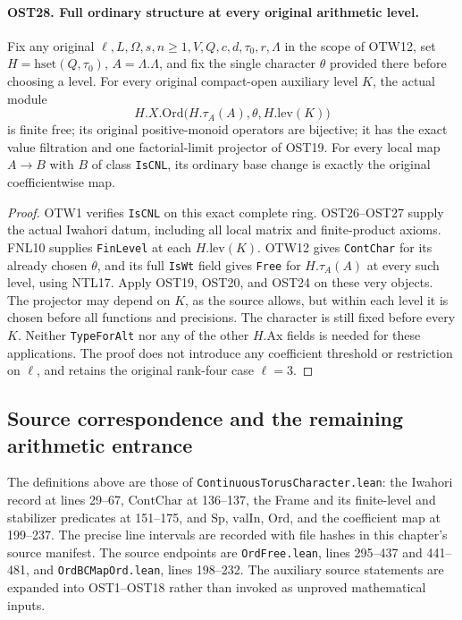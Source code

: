 \paragraph{OST28. Full ordinary structure at every original arithmetic level.}
\label{claim:OST28}
Fix any original $\ell,L,\Omega,s,n\geq1,V,Q,c,d,\tau_0,r,\Lambda$
in the scope of OTW12, set $H=\mathrm{hset}(Q,\tau_0)$,
$A=\Lambda.\Lambda$, and fix the single character $\theta$
provided there before choosing a level.  For every original
compact-open auxiliary level $K$, the actual module
\[
 H.X.\mathrm{Ord}\bigl(H.\tau_A(A),\theta,H.\mathrm{lev}(K)\bigr)
\]
is finite free; its original positive-monoid operators are
bijective; it has the exact value filtration and one
factorial-limit projector of OST19.  For every local map
$A\to B$ with $B$ of class \texttt{IsCNL}, its ordinary
base change is exactly the original coefficientwise map.
\begin{proof}
OTW1 verifies \texttt{IsCNL} on this exact complete ring.
OST26--OST27 supply the actual Iwahori datum, including all
local matrix and finite-product axioms.  FNL10 supplies
\texttt{FinLevel} at each $H.\mathrm{lev}(K)$.  OTW12 gives
\texttt{ContChar} for its already chosen $\theta$, and its
full \texttt{IsWt} field gives \texttt{Free} for
$H.\tau_A(A)$ at every such level, using NTL17.
Apply OST19, OST20, and OST24 on these very objects.
The projector may depend on $K$, as the source allows, but
within each level it is chosen before all functions and
precisions.  The character is still fixed before every $K$.
Neither \texttt{TypeForAlt} nor any of the other
$H.\mathrm{Ax}$ fields is needed for these applications.
The proof does not introduce any coefficient threshold or
restriction on $\ell$, and retains the original rank-four
case $\ell=3$.
\end{proof}

\subsection{Source correspondence and the remaining arithmetic entrance}

The definitions above are those of
\texttt{ContinuousTorusCharacter.lean}: the Iwahori record at
lines 29--67, $\mathrm{ContChar}$ at 136--137, the Frame and
its finite-level and stabilizer predicates at 151--175, and
$\mathrm{Sp}$, $\mathrm{valIn}$, $\mathrm{Ord}$, and the
coefficient map at 199--237.  The precise line intervals are
recorded with file hashes in this chapter's source manifest.
The source endpoints are
\texttt{OrdFree.lean}, lines 295--437 and 441--481, and
\texttt{OrdBCMapOrd.lean}, lines 198--232.  The auxiliary
source statements are expanded into OST1--OST18 rather than
invoked as unproved mathematical inputs.

